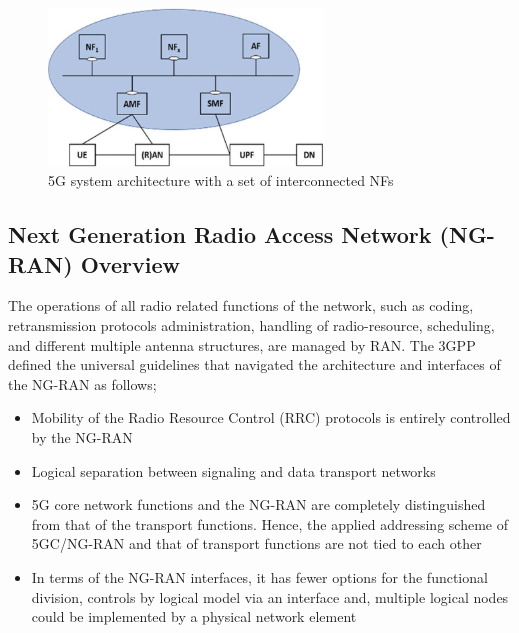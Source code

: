 \documentclass{report}
\begin{document}
\begin{figure}[h]
    \centering
    \includegraphics[width=0.65\textwidth]{figures/nfs5g.png}
    \caption{5G system architecture with a set of interconnected NFs}
    \label{fig:5gnfs}
\end{figure}

\subsection{Next Generation Radio Access Network (NG-RAN) Overview}
The operations of all radio related functions of the network, such as coding, retransmission protocols administration, handling of radio-resource, scheduling, and different multiple antenna structures, are managed by RAN.
The 3GPP \cite{ngran3gpp2020} defined the universal guidelines that navigated the architecture and interfaces of the NG-RAN as follows;
\begin{itemize}
    \item Mobility of the Radio Resource Control (RRC) protocols is entirely controlled by the NG-RAN
    \item Logical separation between signaling and data transport networks
    \item 5G core network functions and the NG-RAN are completely distinguished from that of the transport functions. Hence, the applied addressing scheme of 5GC/NG-RAN and that of transport functions are not tied to each other
    \item In terms of the NG-RAN interfaces, it has fewer options for the functional division, controls by logical model via an interface and, multiple logical nodes could be implemented by a physical network element
\end{itemize}
\end{document}
